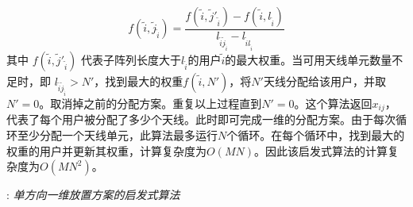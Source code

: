 \begin{equation}
  f({\tilde i}, \tilde j_{\tilde i}) = \frac{f({\tilde i}, \tilde j'_{\tilde i}) - f({\tilde i}, l_{\tilde i})}{l_{\tilde i \tilde j_{\tilde i}}-l_{\tilde i l_{\tilde i}}}
\end{equation}
其中 $f({\tilde i}, \tilde j'_{\tilde i})$ 代表子阵列长度大于$l_{\tilde i}$的用户$\tilde i$的最大权重。当可用天线单元数量不足时，即 $l_{\tilde i \tilde j_{\tilde i}} > N'$，找到最大的权重$f({\tilde i}, N')$，将$N'$天线分配给该用户，并取$N'=0$。取消掉之前的分配方案。重复以上过程直到$N'=0$。这个算法返回$x_{ij}$，代表了每个用户被分配了多少个天线。此时即可完成一维的分配方案。由于每次循环至少分配一个天线单元，此算法最多运行$N$个循环。在每个循环中，找到最大的权重的用户并更新其权重，计算复杂度为$O(MN)$。因此该启发式算法的计算复杂度为$O(MN^2)$。

\begin{algorithm}
\caption{: \emph{单方向一维放置方案的启发式算法}} \label{alg:11}
{
\begin{algorithmic}[1]
\ENDFOR

\ELSE
{}
\ENDIF
{}
\ELSE


\ELSE
{}
\ENDIF
{}
\ENDIF
\ENDWHILE
{}
\end{algorithmic} }
\end{algorithm}

